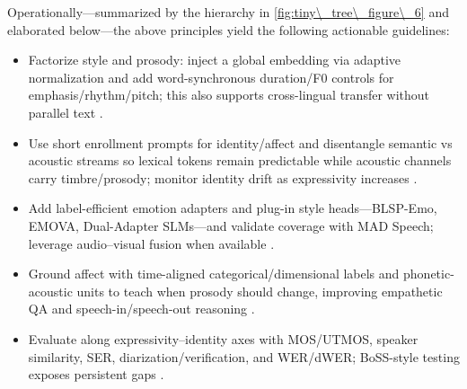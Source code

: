 \documentclass{article}
\begin{document}
Operationally---summarized by the hierarchy in \autoref{fig:tiny\_tree\_figure\_6} and elaborated below---the above principles yield the following actionable guidelines:
\begin{itemize}
\item Factorize style and prosody: inject a global embedding via adaptive normalization and add word-synchronous duration/F0 controls for emphasis/rhythm/pitch; this also supports cross-lingual transfer without parallel text \cite{huang2023holisticcascadesystembenchmarkhumanevalu}.
\item Use short enrollment prompts for identity/affect and disentangle semantic vs acoustic streams so lexical tokens remain predictable while acoustic channels carry timbre/prosody; monitor identity drift as expressivity increases \cite{wang2024evaluatingtextspeechsynthesislargediscre}.
\item Add label-efficient emotion adapters and plug-in style heads---BLSP-Emo, EMOVA, Dual-Adapter SLMs---and validate coverage with MAD Speech; leverage audio--visual fusion when available \cite{wang2024blspemotowardsempatheticlargespeechlangu,futeral2025madspeechmeasuresacousticdiversity,chen2025emovaempoweringlanguagemodelsseehearspea,wang2025dualinformationspeechlanguagemodelsemoti}.
\item Ground affect with time-aligned categorical/dimensional labels and phonetic-acoustic units to teach when prosody should change, improving empathetic QA and speech-in/speech-out reasoning \cite{wang2025incorporatingcontextualparalinguisticund,har-tuv2025pastphoneticacousticspeechtokenizer,entry2025indicsuperbspeechprocessinguniversalperf}.
\item Evaluate along expressivity--identity axes with MOS/UTMOS, speaker similarity, SER, diarization/verification, and WER/dWER; BoSS-style testing exposes persistent gaps \cite{wang2025bossbeyondsemanticspeech}.
\end{itemize}

\end{document}
